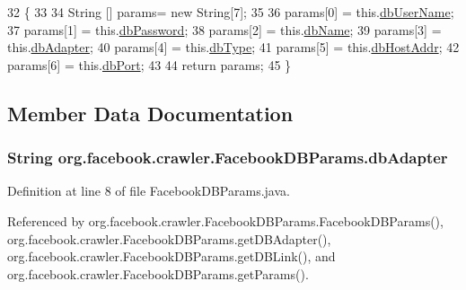 \begin{DoxyCode}
32                                \{
33         
34         String [] params= \textcolor{keyword}{new} String[7];
35         
36         params[0] = this.\hyperlink{classorg_1_1facebook_1_1crawler_1_1_facebook_d_b_params_a071310325d52d718a551589c58abd033}{dbUserName};
37         params[1] = this.\hyperlink{classorg_1_1facebook_1_1crawler_1_1_facebook_d_b_params_a657c173c9d823eaba4721f6eaa2ede3f}{dbPassword};
38         params[2] = this.\hyperlink{classorg_1_1facebook_1_1crawler_1_1_facebook_d_b_params_a7f77783a820785d9c6b19bd5c3072d94}{dbName};
39         params[3] = this.\hyperlink{classorg_1_1facebook_1_1crawler_1_1_facebook_d_b_params_a1144f8f5b1df2af72ad8e1f8980024b7}{dbAdapter};
40         params[4] = this.\hyperlink{classorg_1_1facebook_1_1crawler_1_1_facebook_d_b_params_a080ce06d866679ccd36d9a3d445323e2}{dbType};
41         params[5] = this.\hyperlink{classorg_1_1facebook_1_1crawler_1_1_facebook_d_b_params_a793ad021972ce5b5b6bb88be88f01c67}{dbHostAddr};
42         params[6] = this.\hyperlink{classorg_1_1facebook_1_1crawler_1_1_facebook_d_b_params_ad96c828b8283b58569f4560dacb0145d}{dbPort};
43         
44         \textcolor{keywordflow}{return} params;
45     \}
\end{DoxyCode}


\subsection{Member Data Documentation}
\hypertarget{classorg_1_1facebook_1_1crawler_1_1_facebook_d_b_params_a1144f8f5b1df2af72ad8e1f8980024b7}{
\subsubsection[{db\-Adapter}]{\setlength{\rightskip}{0pt plus 5cm}String org.\-facebook.\-crawler.\-Facebook\-D\-B\-Params.\-db\-Adapter\hspace{0.3cm}{\ttfamily [private]}}}\label{classorg_1_1facebook_1_1crawler_1_1_facebook_d_b_params_a1144f8f5b1df2af72ad8e1f8980024b7}


Definition at line 8 of file Facebook\-D\-B\-Params.\-java.



Referenced by org.\-facebook.\-crawler.\-Facebook\-D\-B\-Params.\-Facebook\-D\-B\-Params(), org.\-facebook.\-crawler.\-Facebook\-D\-B\-Params.\-get\-D\-B\-Adapter(), org.\-facebook.\-crawler.\-Facebook\-D\-B\-Params.\-get\-D\-B\-Link(), and org.\-facebook.\-crawler.\-Facebook\-D\-B\-Params.\-get\-Params().

